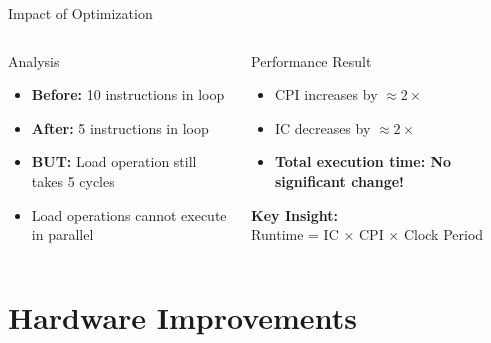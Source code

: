 \documentclass[aspectratio=169,12pt]{beamer}
\begin{document}
\begin{frame}{Impact of Optimization}
\begin{columns}
\begin{block}{Analysis}
\begin{itemize}
    \item \textbf{Before:} 10 instructions in loop
    \item \textbf{After:} 5 instructions in loop
    \item \textbf{BUT:} Load operation still takes 5 cycles
    \item Load operations cannot execute in parallel
\end{itemize}
\end{block}

\begin{alertblock}{Performance Result}
\begin{itemize}
    \item CPI increases by $\approx 2\times$
    \item IC decreases by $\approx 2\times$
    \item \textbf{Total execution time: No significant change!}
\end{itemize}

\vspace{0.3cm}
\textbf{Key Insight:}\\
Runtime = IC × CPI × Clock Period
\end{alertblock}
\end{columns}
\end{frame}

\section{Hardware Improvements}
\end{document}
